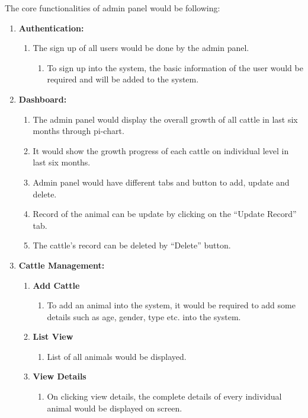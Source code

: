 	The core functionalities of admin panel would be following: 
\begin{enumerate}
	\item \textbf{Authentication:}
	\begin{enumerate}
		\item The sign up of all users would be done by the admin panel. 
		\begin{enumerate}
			\item To sign up into the system, the basic information of the user would be required and will be added to the system. 
		\end{enumerate}
	\end{enumerate}

	\item \textbf{Dashboard:}
\begin{enumerate}
	\item The admin panel would display the overall growth of all cattle in last six months through pi-chart. 
	\item It would show the growth progress of each cattle on individual level in last six months. 
	\item Admin panel would have different tabs and button to add, update and delete.
	  \item Record of the animal can be update by clicking on the “Update Record” tab. 
	 \item The cattle’s record can be deleted by “Delete” button. 
\end{enumerate}

	\item \textbf{Cattle Management: }
	
	\begin{enumerate}
		\item \textbf{Add Cattle}
		\begin{enumerate}
			\item To add an animal into the system, it would be required to add some details such as age, gender, type etc. into the system.
		\end{enumerate}
		\item \textbf{List View}
		\begin{enumerate}
			\item List of all animals would be displayed.
		\end{enumerate}
		\item \textbf{View Details}
		\begin{enumerate}
			\item On clicking view details, the complete details of every individual animal would be displayed on screen. 
		\end{enumerate}
\end{enumerate}
	

\end{enumerate}
